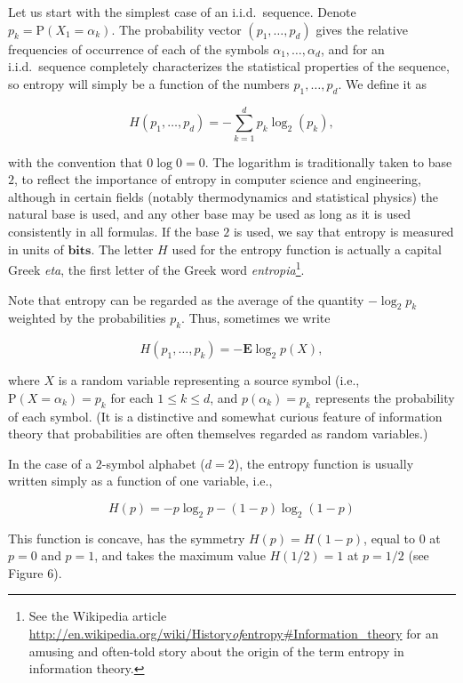 Let us start with the simplest case of an i.i.d.\
sequence. Denote $p_k = \mathrm{P}(X_1 = \alpha_k)$.
The probability vector $(p_1,\ldots,p_d)$ gives the
relative frequencies of occurrence of each of the
symbols $\alpha_1,\ldots,\alpha_d$, and for an
i.i.d.\ sequence completely characterizes the
statistical properties of the sequence, so entropy
will simply be a function of the numbers
$p_1,\ldots,p_d$. We define it as

\[
H(p_1,\ldots,p_d) = -\sum_{k=1}^d p_k \log_2(p_k),
\]

\noindent with the convention that $0\log 0 = 0$. The logarithm
is traditionally taken to base $2$, to reflect the
importance of entropy in computer science and
engineering, although in certain fields (notably
thermodynamics and statistical physics) the natural
base is used, and any other base may be used as long
as it is used consistently in all formulas. If the
base $2$ is used, we say that entropy is measured in
units of $\textbf{bits}$. The letter $H$ used for the
entropy function is actually a capital Greek \emph{eta},
the first letter of the Greek word
\emph{entropia}\footnote{See the Wikipedia article
\href{http://en.wikipedia.org/wiki/History_of_entropy\#Information_theory}{http://en.wikipedia.org/wiki/History\emph{of}entropy\#Information\_theory}
for an amusing and often-told story about the origin
of the term entropy in information theory.}.

Note that entropy can be regarded as the average of
the quantity $-\log_2 p_k$ weighted by the
probabilities $p_k$. Thus, sometimes we write

\[
H(p_1,\ldots,p_k) = -\mathbf{E} \log_2 p(X),
\]

\noindent where $X$ is a random variable representing a source
symbol (i.e., $\mathrm{P}(X=\alpha_k)=p_k$ for each
$1\le k\le d$, and $p(\alpha_k)=p_k$ represents the
probability of each symbol. (It is a distinctive and
somewhat curious feature of information theory that
probabilities are often themselves regarded as random
variables.)

\begin{example}
In the case of a $2$-symbol alphabet ($d=2$), the
entropy function is usually written simply as a
function of one variable, i.e.,

\[
H(p) = -p\log_2 p - (1-p) \log_2 (1-p)
\]

\noindent This function is concave, has the symmetry
$H(p)=H(1-p)$, equal to $0$ at $p=0$ and $p=1$, and
takes the maximum value $H(1/2)=1$ at $p=1/2$ (see
Figure 6).
\end{example}

